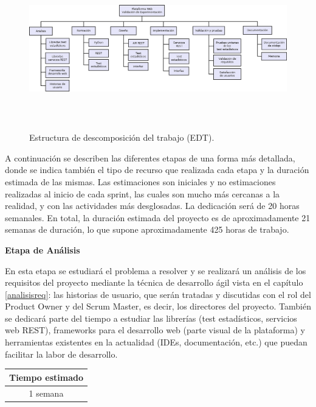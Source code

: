 \begin{figure}[H]
\centering
\includegraphics[width=14cm,height=7cm]{figuras/edt.png}
\caption{Estructura de descomposición del trabajo (EDT).}
\label{fig:edt}
\end{figure}

A continuación se describen las diferentes etapas de una forma más detallada, donde se indica también el tipo de recurso que realizada cada etapa y la duración estimada de las mismas. Las estimaciones son iniciales y no estimaciones realizadas al inicio de cada sprint, las cuales son mucho más cercanas a la realidad, y con las actividades más desglosadas. La dedicación será de 20 horas semanales. En total, la duración estimada del proyecto es de aproximadamente 21 semanas de duración, lo que supone aproximadamente 425 horas de trabajo.

\noindent
\textbf{Etapa de Análisis}

En esta etapa se estudiará el problema a resolver y se realizará un análisis de los requisitos del proyecto mediante la técnica de desarrollo ágil vista en el capítulo \ref{analisisreq}: las historias de usuario, que serán tratadas y discutidas con el rol del Product Owner y del Scrum Master, es decir, los directores del proyecto. También se dedicará parte del tiempo a estudiar las librerías (test estadísticos, servicios web REST), frameworks para el desarrollo web (parte visual de la plataforma) y herramientas existentes en la actualidad (IDEs, documentación, etc.) que puedan facilitar la labor de desarrollo.

\begin{table}[H]
	\centering
	\begin{tabular}{|c|}
		\hline
		\textbf{Tiempo estimado} \\ \hline
		1 semana \\ \hline
	\end{tabular}
\end{table}

